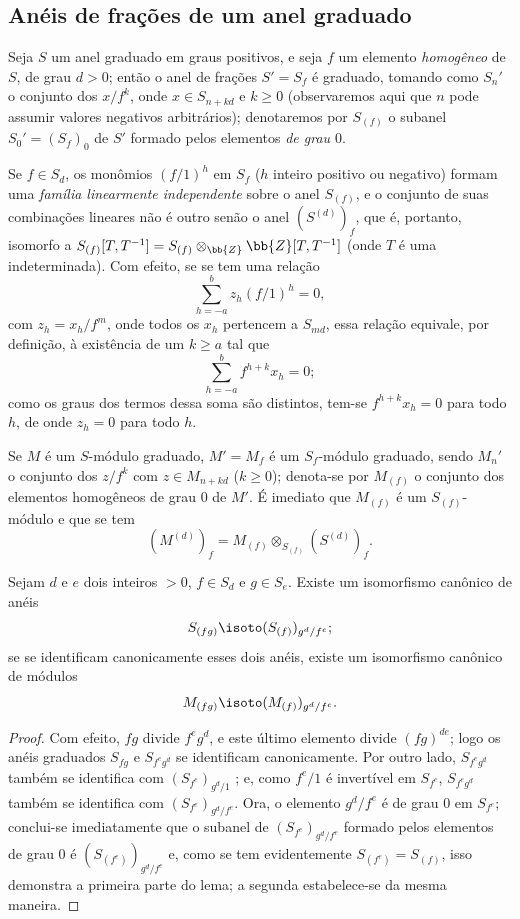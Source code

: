 \documentclass[oneside,10pt]{amsart}
\renewcommand{\geq}{\geqslant}
\newcommand{\oldpage}[2][]{\marginnote{\normalfont\footnotesize\textbf{#1}~|~#2}\ignorespaces}
\let\EGAOriginalLabel\label
\renewcommand{\label}[1]{\phantomsection\EGAOriginalLabel{#1}}
\begin{document}
\subsection{Anéis de frações de um anel graduado}
\label{subsection:II.2.2}

\begin{env}[2.2.1]
\label{II.2.2.1}
Seja $S$ um anel graduado em graus positivos, e seja $f$ um elemento \emph{homogêneo} de $S$, de grau $d>0$; então o anel de frações $S'=S_f$ é graduado, tomando como $S_n'$ o conjunto dos $x/f^k$, onde $x\in S_{n+kd}$ e $k\geq0$ (observaremos aqui que $n$ pode assumir valores negativos arbitrários); denotaremos por $S_{(f)}$ o subanel $S_0'=(S_f)_0$ de $S'$ formado pelos elementos \emph{de grau $0$}.

Se $f\in S_d$, os monômios $(f/1)^h$ em $S_f$ ($h$ inteiro positivo ou negativo) formam uma \emph{família linearmente independente} sobre o anel $S_{(f)}$, e o conjunto de suas combinações lineares não é outro senão
\oldpage[II]{24}
o anel $(S^{(d)})_f$, que é, portanto, isomorfo a $S_{(f)}[T,T^{-1}]=S_{(f)}\otimes_\bb{Z}\bb{Z}[T,T^{-1}]$ (onde $T$ é uma indeterminada).
Com efeito, se se tem uma relação
\[
  \sum_{h=-a}^{b}z_h(f/1)^h=0,
\]
com $z_h=x_h/f^m$, onde todos os $x_h$ pertencem a $S_{md}$, essa relação equivale, por definição, à existência de um $k\geq a$ tal que
\[
  \sum_{h=-a}^{b}f^{h+k}x_h=0;
\]
como os graus dos termos dessa soma são distintos, tem-se $f^{h+k}x_h=0$ para todo $h$, de onde $z_h=0$ para todo $h$.

Se $M$ é um $S$-módulo graduado, $M'=M_f$ é um $S_f$-módulo graduado, sendo $M_n'$ o conjunto dos $z/f^k$ com $z\in M_{n+kd}$ ($k\geq0$); denota-se por $M_{(f)}$ o conjunto dos elementos homogêneos de grau $0$ de $M'$.
É imediato que $M_{(f)}$ é um $S_{(f)}$-módulo e que se tem
\[
  (M^{(d)})_f=M_{(f)}\otimes_{S_{(f)}}(S^{(d)})_f.
\]
\end{env}

\begin{lemma}[2.2.2]
\label{II.2.2.2}
Sejam $d$ e $e$ dois inteiros $>0$, $f\in S_d$ e $g\in S_e$.
Existe um isomorfismo canônico de anéis
\[
  S_{(fg)}\isoto(S_{(f)})_{g^d/f^e};
\]
se se identificam canonicamente esses dois anéis, existe um isomorfismo canônico de módulos
\[
  M_{(fg)}\isoto(M_{(f)})_{g^d/f^e}.
\]
\end{lemma}

\begin{proof}
Com efeito, $fg$ divide $f^eg^d$, e este último elemento divide $(fg)^{de}$; logo os anéis graduados $S_{fg}$ e $S_{f^eg^d}$ se identificam canonicamente.
Por outro lado, $S_{f^eg^d}$ também se identifica com $(S_{f^e})_{g^d/1}$ ; e, como $f^e/1$ é invertível em $S_{f^e}$, $S_{f^eg^d}$ também se identifica com $(S_{f^e})_{g^d/f^e}$.
Ora, o elemento $g^d/f^e$ é de grau $0$ em $S_{f^e}$; conclui-se imediatamente que o subanel de $(S_{f^e})_{g^d/f^e}$ formado pelos elementos de grau $0$ é $(S_{(f^e)})_{g^d/f^e}$ e, como se tem evidentemente $S_{(f^e)}=S_{(f)}$, isso demonstra a primeira parte do lema; a segunda estabelece-se da mesma maneira.
\end{proof}
\end{document}
